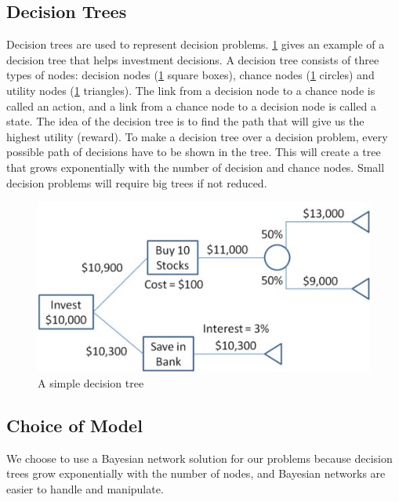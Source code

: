 \subsection{Decision Trees}
Decision trees are used to represent decision problems. \ref{fig:basicdecisiontree} gives an example of a decision tree that helps investment decisions. A decision tree consists of three types of nodes: decision nodes (\ref{fig:basicdecisiontree} square boxes), chance nodes (\ref{fig:basicdecisiontree} circles) and utility nodes (\ref{fig:basicdecisiontree} triangles). The link from a decision node to a chance node is called an action, and a link from a chance node to a decision node is called a state. The idea of the decision tree is to find the path that will give us the highest utility (reward). To make a decision tree over a decision problem, every possible path of decisions have to be shown in the tree. This will create a tree that grows exponentially with the number of decision and chance nodes. Small decision problems will require big trees if not reduced. 
	
\begin{figure}[H]
\includegraphics[scale=.5]{Figures/BayesianPictures/SimpleDecisionTree.png}
\caption{A simple decision tree \cite{sdt}}
\label{fig:basicdecisiontree}
\end{figure}

\subsection{Choice of Model}
We choose to use a Bayesian network solution for our problems because decision trees grow exponentially with the number of nodes, and 
Bayesian networks are easier to handle and manipulate.
